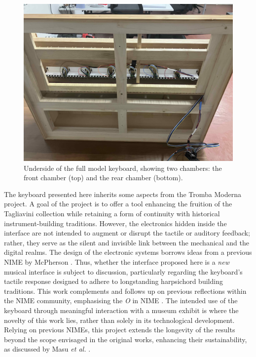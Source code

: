 \begin{figure}
  \centering
  \includegraphics[width=\linewidth]{src/images/49-key-bottom-sensors-no-keys.jpg} 
  \caption{Underside of the full model keyboard, showing two chambers: the front chamber (top) and the rear chamber (bottom).} 
  \Description{} 
  \label{fig:49-key-bottom}
\end{figure}

The keyboard presented here inherits some aspects from the Tromba Moderna project. A goal of the project is to offer a tool enhancing the fruition of the Tagliavini collection while retaining a form of continuity with historical instrument-building traditions. However, the electronics hidden inside the interface are not intended to augment or disrupt the tactile or auditory feedback; rather, they serve as the silent and invisible link between the mechanical and the digital realms. The design of the electronic systems borrows ideas from a previous NIME by McPherson \cite{McPherson2013}. Thus, whether the interface proposed here is a \emph{new} musical interface is subject to discussion, particularly regarding the keyboard's tactile response designed to adhere to longstanding harpsichord building traditions. This work complements and follows up on previous reflections within the NIME community, emphasising the \emph{O} in NIME \cite{Masu_NIME_2023}. The intended use of the keyboard through meaningful interaction with a museum exhibit is where the novelty of this work lies, rather than solely in its technological development. Relying on previous NIMEs, this project extends the longevity of the results beyond the scope envisaged in the original works, enhancing their sustainability, as discussed by Masu \emph{et al.} \cite{Masu_NIME_2023}.

